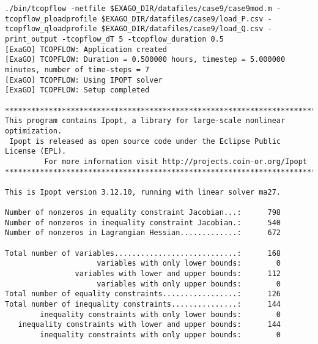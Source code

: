 \begin{lstlisting}
./bin/tcopflow -netfile $EXAGO_DIR/datafiles/case9/case9mod.m -tcopflow_ploadprofile $EXAGO_DIR/datafiles/case9/load_P.csv -tcopflow_qloadprofile $EXAGO_DIR/datafiles/case9/load_Q.csv -print_output -tcopflow_dT 5 -tcopflow_duration 0.5
[ExaGO] TCOPFLOW: Application created
[ExaGO] TCOPFLOW: Duration = 0.500000 hours, timestep = 5.000000 minutes, number of time-steps = 7
[ExaGO] TCOPFLOW: Using IPOPT solver
[ExaGO] TCOPFLOW: Setup completed

******************************************************************************
This program contains Ipopt, a library for large-scale nonlinear optimization.
 Ipopt is released as open source code under the Eclipse Public License (EPL).
         For more information visit http://projects.coin-or.org/Ipopt
******************************************************************************

This is Ipopt version 3.12.10, running with linear solver ma27.

Number of nonzeros in equality constraint Jacobian...:      798
Number of nonzeros in inequality constraint Jacobian.:      540
Number of nonzeros in Lagrangian Hessian.............:      672

Total number of variables............................:      168
                     variables with only lower bounds:        0
                variables with lower and upper bounds:      112
                     variables with only upper bounds:        0
Total number of equality constraints.................:      126
Total number of inequality constraints...............:      144
        inequality constraints with only lower bounds:        0
   inequality constraints with lower and upper bounds:      144
        inequality constraints with only upper bounds:        0


\end{lstlisting}
